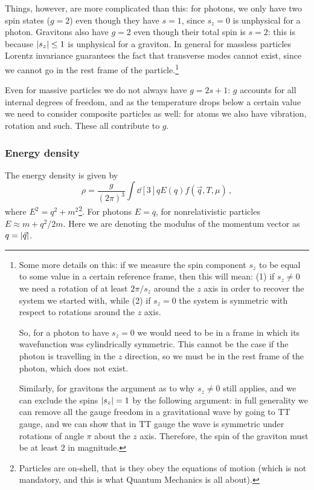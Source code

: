 \documentclass[main.tex]{subfiles}
\begin{document}
Things, however, are more complicated than this: for photons, we only have two spin states (\(g=2\)) even though they have \(s=1\), since \(s_z=0\) is unphysical for a photon. 
Gravitons also have \(g=2\) even though their total spin is \(s=2\): this is because \(\abs{s_z} \leq 1 \) is unphysical for a graviton. 
In general for massless particles Lorentz invariance guarantees the fact that transverse modes cannot exist, since we cannot go in the rest frame of the particle.\footnote{Some more details on this: if we measure the spin component \(s_z\) to be equal to some value in a certain reference frame, then this will mean: (1) if \(s_z \neq 0 \) we need a rotation of at least \(2 \pi / s_z\) around the \(z\) axis in order to recover the system we started with, while (2) if \(s_z=0\) the system is symmetric with respect to rotations around the \(z\) axis. 

So, for a photon to have \(s_z=0\) we would need to be in a frame in which its wavefunction was cylindrically symmetric. This cannot be the case if the photon is travelling in the \(z\) direction, so we must be in the rest frame of the photon, which does not exist. 

Similarly, for gravitons the argument as to why \(s_z \neq 0\) still applies, and we can exclude the spins \(\abs{s_z} = 1\) by the following argument: in full generality we can remove all the gauge freedom in a gravitational wave by going to TT gauge, and we can show that in TT gauge the wave is symmetric under rotations of angle \(\pi \) about the \(z\) axis. 
Therefore, the spin of the graviton must be at least \(2\) in magnitude.}

Even for massive particles we do not always have \(g = 2s+1\): \(g\) accounts for all internal degrees of freedom, and as the temperature drops below a certain value we need to consider composite particles as well: for atoms we also have vibration, rotation and such. These all contribute to \(g\). 

\subsubsection{Energy density}

The energy density is given by
%
\begin{equation} \label{eq:energy-density-momentum-space}
  \rho = \frac{g}{(2 \pi )^3} \int \dd[3]{q} E(q) f(\vec{q}, T, \mu ) 
\,,
\end{equation}
%
where \(E^2 = q^2 + m^2\)\footnote{Particles are on-shell, that is they obey the equations of motion (which is not mandatory, and this is what Quantum Mechanics is all about).}.
For photons \(E = q\), for nonrelativistic particles \(E \approx m + q^2 / 2m\).
Here we are denoting the modulus of the momentum vector as \(q = \abs{\vec{q}}\). 
\end{document}
